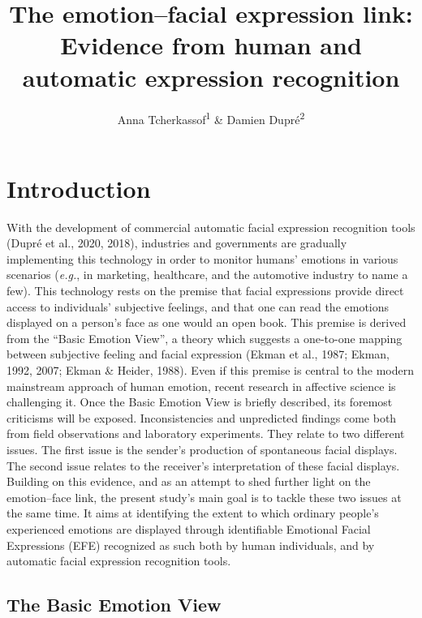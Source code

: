 \documentclass[
  english,
  doc]{apa7}
\title{The emotion--facial expression link: Evidence from human and automatic expression recognition}
\author{Anna Tcherkassof\textsuperscript{1} \& Damien Dupré\textsuperscript{2}}
\date{}
\affiliation{\vspace{0.5cm}\textsuperscript{1} University Grenoble Alpes, Grenoble, France\\\textsuperscript{2} Dublin City University, Dublin, Ireland}
\begin{document}
\maketitle







\hypertarget{introduction}{%
\section{Introduction}\label{introduction}}

With the development of commercial automatic facial expression recognition tools (Dupré et al., 2020, 2018), industries and governments are gradually implementing this technology in order to monitor humans' emotions in various scenarios (\emph{e.g.}, in marketing, healthcare, and the automotive industry to name a few). This technology rests on the premise that facial expressions provide direct access to individuals' subjective feelings, and that one can read the emotions displayed on a person's face as one would an open book. This premise is derived from the ``Basic Emotion View'', a theory which suggests a one-to-one mapping between subjective feeling and facial expression (Ekman et al., 1987; Ekman, 1992, 2007; Ekman \& Heider, 1988). Even if this premise is central to the modern mainstream approach of human emotion, recent research in affective science is challenging it. Once the Basic Emotion View is briefly described, its foremost criticisms will be exposed. Inconsistencies and unpredicted findings come both from field observations and laboratory experiments. They relate to two different issues. The first issue is the sender's production of spontaneous facial displays. The second issue relates to the receiver's interpretation of these facial displays. Building on this evidence, and as an attempt to shed further light on the emotion--face link, the present study's main goal is to tackle these two issues at the same time. It aims at identifying the extent to which ordinary people's experienced emotions are displayed through identifiable Emotional Facial Expressions (EFE) recognized as such both by human individuals, and by automatic facial expression recognition tools.

\hypertarget{the-basic-emotion-view}{%
\subsection{The Basic Emotion View}\label{the-basic-emotion-view}}
\end{document}

